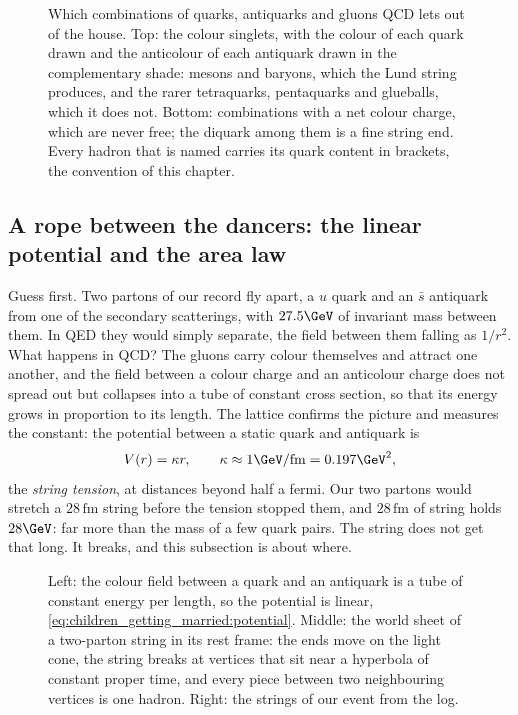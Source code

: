 \begin{figure}[htbp]\centering
\resizebox{\textwidth}{!}{}
\caption[Which combinations of quarks and antiquarks QCD lets out]{Which
combinations of quarks, antiquarks and gluons QCD lets out of the house.
Top: the colour singlets, with the colour of each quark drawn and the
anticolour of each antiquark drawn in the complementary shade: mesons and
baryons, which the Lund string produces, and the rarer tetraquarks,
pentaquarks and glueballs, which it does not. Bottom: combinations with a
net colour charge, which are never free; the diquark among them is a fine
string end. Every hadron that is named carries its quark content in
brackets, the convention of this chapter.}
\label{fig:children_getting_married:singlets_sketch}
\end{figure}

\subsection{A rope between the dancers: the linear potential and the area law}
\label{sec:children_getting_married:string}

Guess first. Two partons of our record fly apart, a $u$ quark and an $\bar s$
antiquark from one of the secondary scatterings, with $27.5\GeV$ of
invariant mass between them. In QED they would simply separate, the field
between them falling as $1/r^2$. What happens in QCD? The gluons carry
colour themselves and attract one another, and the field between a colour
charge and an anticolour charge does not spread out but collapses into a
tube of constant cross section, so that its energy grows in proportion to
its length. The lattice confirms the picture and measures the constant: the
potential between a static quark and antiquark is
\begin{equation}
  V(r)=\kappa r,\qquad \kappa\approx1\GeV/\mathrm{fm}=0.197\GeV^2,
  \label{eq:children_getting_married:potential}
\end{equation}
the \emph{string tension}, at distances beyond half a fermi. Our two
partons would stretch a $28\,\mathrm{fm}$ string before the tension stopped
them, and $28\,\mathrm{fm}$ of string holds $28\GeV$: far more than the
mass of a few quark pairs. The string does not get that long. It breaks,
and this subsection is about where.

\begin{figure}[htbp]\centering
\resizebox{\textwidth}{!}{}
\caption[The Lund string, its world sheet and the strings of our event]{Left:
the colour field between a quark and an antiquark is a tube of constant
energy per length, so the potential is linear,
\cref{eq:children_getting_married:potential}. Middle: the world sheet of a
two-parton string in its rest frame: the ends move on the light cone, the
string breaks at vertices that sit near a hyperbola of constant proper
time, and every piece between two neighbouring vertices is one hadron.
Right: the strings of our event from the  log.}
\label{fig:children_getting_married:string_sketch}
\end{figure}

